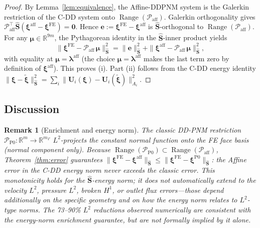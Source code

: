 \documentclass[11pt,a4paper]{article}
\newtheorem{remark}[lemma]{Remark}
\newcommand{\R}{\mathbb{R}}
\newcommand{\trac}{\bm{\lambda}}
\newcommand{\Schur}{\mathbf{S}}
\newcommand{\respvel}{\mathbf{U}}
\begin{document}
\begin{proof}
  By Lemma~\ref{lem:equivalence}, the Affine-DDPNM system is the Galerkin
  restriction of the C-DD system onto $\operatorname{Range}(\mathcal{P}_{\text{aff}})$.
  Galerkin orthogonality gives
  $\mathcal{P}_{\text{aff}}^\top \widehat{\Schur}
   (\bm{\xi}^{\text{aff}} - \bm{\xi}^{\text{FE}}) = \bm{0}$.
  Hence $\bm{e} := \bm{\xi}^{\text{FE}} - \bm{\xi}^{\text{aff}}$ is
  $\widehat{\Schur}$-orthogonal to $\operatorname{Range}(\mathcal{P}_{\text{aff}})$.
  For any $\bm{\mu} \in \R^{9m}$, the Pythagorean identity in the
  $\widehat{\Schur}$-inner product yields
  \[
    \|\bm{\xi}^{\text{FE}} - \mathcal{P}_{\text{aff}}\,\bm{\mu}
      \|_{\widehat{\Schur}}^2
    = \|\bm{e}\|_{\widehat{\Schur}}^2
      + \|\bm{\xi}^{\text{aff}}
        - \mathcal{P}_{\text{aff}}\,\bm{\mu}\|_{\widehat{\Schur}}^2,
  \]
  with equality at $\bm{\mu} = \trac^{\text{aff}}$ (the choice
  $\bm{\mu} = \trac^{\text{aff}}$ makes the last term zero by definition
  of $\bm{\xi}^{\text{aff}}$).
  This proves (i).  Part (ii) follows from the C-DD energy identity
  $\|\bm{\xi} - \tilde{\bm{\xi}}\|_{\widehat{\Schur}}^2
   = \sum_i \|\respvel_i(\bm{\xi}) - \respvel_i(\tilde{\bm{\xi}})\|_{A_i}^2$.
\end{proof}

\subsection{Discussion}

\begin{remark}[Enrichment and energy norm]\label{rem:enrichment}
  The classic DD-PNM restriction $\mathcal{P}_{\text{P0}} : \R^m \to
  \R^{m_\Gamma}$ $L^2$-projects the constant normal function onto the
  FE face basis (normal component only).  Because
  $\operatorname{Range}(\mathcal{P}_{\text{P0}})
   \subset \operatorname{Range}(\mathcal{P}_{\text{aff}})$,
  Theorem~\ref{thm:error} guarantees
  $\|\bm{\xi}^{\text{FE}} - \bm{\xi}^{\text{aff}}\|_{\widehat{\Schur}}
   \le \|\bm{\xi}^{\text{FE}}
     - \bm{\xi}^{\text{P0}}\|_{\widehat{\Schur}}$:
  the Affine error in the C-DD energy norm never exceeds the classic error.
  This monotonicity holds for the $\widehat{\Schur}$-energy norm; it does
  \emph{not} automatically extend to the velocity $L^2$, pressure $L^2$,
  broken $H^1$, or outlet flux errors---those depend additionally on the
  specific geometry and on how the energy norm relates to $L^2$-type norms.
  The 73--90\% $L^2$ reductions observed numerically are \emph{consistent}
  with the energy-norm enrichment guarantee, but are not formally implied
  by it alone.
\end{remark}
\end{document}

